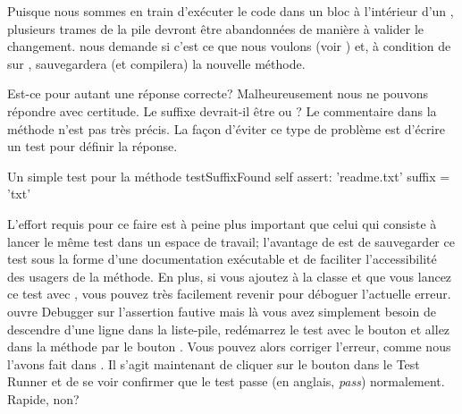 \documentclass[a4paper,10pt,twoside]{book}
\begin{document}
Puisque nous sommes en train d'exécuter le code dans un bloc à
l'intérieur d'un , plusieurs trames de la pile 
devront être abandonnées de manière à valider le changement.
\pharo nous demande si c'est ce que nous voulons (voir )
et, à condition de \click{} sur , \pharo sauvegardera
(et compilera) la nouvelle méthode.



Est-ce pour autant une réponse correcte?  Malheureusement nous ne pouvons
répondre avec certitude.
Le suffixe devrait-il être  ou ?
Le commentaire dans la méthode  n'est pas très précis.
La façon d'éviter ce type de problème est d'écrire
un test  pour définir la réponse.

\begin{method}[testSuffix]{Un simple test pour la méthode }
testSuffixFound
	self assert: 'readme.txt' suffix = 'txt'
\end{method}

L'effort requis pour ce faire est à peine plus important que celui
qui consiste à lancer le même test dans un espace de travail;
l'avantage de \sunit est de sauvegarder ce test sous la forme d'une
documentation exécutable et de faciliter l'accessibilité des usagers
de la méthode.
En plus, si vous ajoutez  à la classe
 et que vous lancez ce test avec \sunit, vous
pouvez très facilement revenir pour déboguer l'actuelle erreur.
\sunit ouvre Debugger sur l'assertion fautive mais là vous
avez simplement besoin de descendre d'une ligne dans la liste-pile,
redémarrez le test avec le bouton  et allez
dans la méthode  par le bouton . Vous
pouvez alors corriger l'erreur, comme nous l'avons fait dans
.
Il s'agit maintenant de cliquer sur le bouton  dans
le \sunit Test Runner et de se voir confirmer que le test passe (en anglais, \emph{pass}) 
normalement. Rapide, non?
\end{document}
